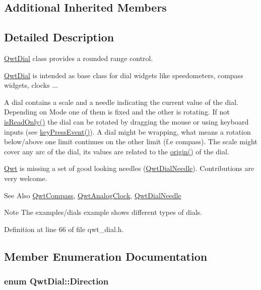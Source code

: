 \subsection*{Additional Inherited Members}


\subsection{Detailed Description}
\hyperlink{class_qwt_dial}{Qwt\-Dial} class provides a rounded range control. 

\hyperlink{class_qwt_dial}{Qwt\-Dial} is intended as base class for dial widgets like speedometers, compass widgets, clocks ...



A dial contains a scale and a needle indicating the current value of the dial. Depending on Mode one of them is fixed and the other is rotating. If not \hyperlink{class_qwt_abstract_slider_a040fd1fd03592c524314bf4b5539608d}{is\-Read\-Only()} the dial can be rotated by dragging the mouse or using keyboard inputs (see \hyperlink{class_qwt_dial_a61a2341a76abc20ea5bd72a0485be136}{key\-Press\-Event()}). A dial might be wrapping, what means a rotation below/above one limit continues on the other limit (f.\-e compass). The scale might cover any arc of the dial, its values are related to the \hyperlink{class_qwt_dial_a5d7a8b9094bcc3fb82b31c3ac9ad706d}{origin()} of the dial.

\hyperlink{namespace_qwt}{Qwt} is missing a set of good looking needles (\hyperlink{class_qwt_dial_needle}{Qwt\-Dial\-Needle}). Contributions are very welcome.

\begin{DoxySeeAlso}{See Also}
\hyperlink{class_qwt_compass}{Qwt\-Compass}, \hyperlink{class_qwt_analog_clock}{Qwt\-Analog\-Clock}, \hyperlink{class_qwt_dial_needle}{Qwt\-Dial\-Needle} 
\end{DoxySeeAlso}
\begin{DoxyNote}{Note}
The examples/dials example shows different types of dials. 
\end{DoxyNote}


Definition at line 66 of file qwt\-\_\-dial.\-h.



\subsection{Member Enumeration Documentation}
\hypertarget{class_qwt_dial_af6bee6040f4342d4d60c5e1cf3a06b54}{
\subsubsection[{Direction}]{\setlength{\rightskip}{0pt plus 5cm}enum {\bf Qwt\-Dial\-::\-Direction}}}\label{class_qwt_dial_af6bee6040f4342d4d60c5e1cf3a06b54}


